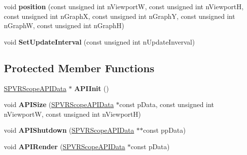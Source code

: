 \begin{DoxyCompactItemize}
\item 
\hypertarget{class_c_p_v_r_scope_graph_aa5dafb35ba5d67fb02b5c23dadb266af}{void {\bfseries position} (const unsigned int n\+Viewport\+W, const unsigned int n\+Viewport\+H, const unsigned int n\+Graph\+X, const unsigned int n\+Graph\+Y, const unsigned int n\+Graph\+W, const unsigned int n\+Graph\+H)}\label{class_c_p_v_r_scope_graph_aa5dafb35ba5d67fb02b5c23dadb266af}

\item 
\hypertarget{class_c_p_v_r_scope_graph_a092c939d71214f7cc9f19791406b8d0d}{void {\bfseries Set\+Update\+Interval} (const unsigned int n\+Update\+Inverval)}\label{class_c_p_v_r_scope_graph_a092c939d71214f7cc9f19791406b8d0d}

\end{DoxyCompactItemize}
\subsection*{Protected Member Functions}
\begin{DoxyCompactItemize}
\item 
\hypertarget{class_c_p_v_r_scope_graph_a495ff1d274281d350bcd7695226b903b}{\hyperlink{struct_s_p_v_r_scope_a_p_i_data}{S\+P\+V\+R\+Scope\+A\+P\+I\+Data} $\ast$ {\bfseries A\+P\+I\+Init} ()}\label{class_c_p_v_r_scope_graph_a495ff1d274281d350bcd7695226b903b}

\item 
\hypertarget{class_c_p_v_r_scope_graph_a30477f487d8c118562c333b552be44f9}{void {\bfseries A\+P\+I\+Size} (\hyperlink{struct_s_p_v_r_scope_a_p_i_data}{S\+P\+V\+R\+Scope\+A\+P\+I\+Data} $\ast$const p\+Data, const unsigned int n\+Viewport\+W, const unsigned int n\+Viewport\+H)}\label{class_c_p_v_r_scope_graph_a30477f487d8c118562c333b552be44f9}

\item 
\hypertarget{class_c_p_v_r_scope_graph_abed66cbfe776782173d3dd7823b16326}{void {\bfseries A\+P\+I\+Shutdown} (\hyperlink{struct_s_p_v_r_scope_a_p_i_data}{S\+P\+V\+R\+Scope\+A\+P\+I\+Data} $\ast$$\ast$const pp\+Data)}\label{class_c_p_v_r_scope_graph_abed66cbfe776782173d3dd7823b16326}

\item 
\hypertarget{class_c_p_v_r_scope_graph_a7895c9219f5dc379b8dfd48a440baf1c}{void {\bfseries A\+P\+I\+Render} (\hyperlink{struct_s_p_v_r_scope_a_p_i_data}{S\+P\+V\+R\+Scope\+A\+P\+I\+Data} $\ast$const p\+Data)}\label{class_c_p_v_r_scope_graph_a7895c9219f5dc379b8dfd48a440baf1c}

\end{DoxyCompactItemize}
